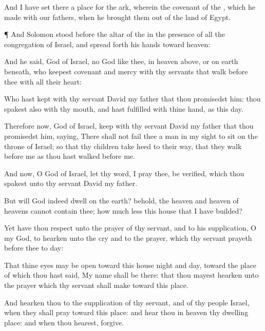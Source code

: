 {And I have
set there a
place for the
ark, wherein
{} the
covenant of the
{}, which he
made with our
fathers, when he brought them
out of the
land of
Egypt.


\par }{\PP {}¶ And
Solomon
stood
before the
altar of the
{} in the presence
of all the
congregation of
Israel, and spread
forth his
hands toward
heaven:

And he
said,
{}
God of
Israel,
{} no
God like thee, in
heaven
above, or on
earth beneath, who
keepest
covenant and
mercy with thy
servants that
walk
before thee with all their
heart:

Who hast
kept with thy
servant
David my
father that thou
promisedst him: thou
spakest also with thy
mouth, and hast
fulfilled
{} with thine
hand, as
{} this
day.

Therefore now,
{}
God of
Israel,
keep with thy
servant
David my
father that thou
promisedst him,
saying, There shall not
fail thee a
man in my
sight to
sit on the
throne of
Israel;
so that thy
children take
heed to their
way, that they
walk
before me as thou hast
walked
before me.

And now, O
God of
Israel, let thy
word, I pray thee, be
verified, which thou
spakest unto thy
servant
David my
father.

But will
God
indeed
dwell on the
earth? behold, the
heaven and
heaven of
heavens cannot
contain thee; how much
less this
house that I have
builded?

Yet have thou
respect unto the
prayer of thy
servant, and to his
supplication, O
{} my
God, to
hearken unto the
cry and to the
prayer, which thy
servant
prayeth
before thee to
day:

That thine
eyes may be
open toward this
house
night and
day,
{} toward the
place of which thou hast
said, My
name shall be there: that thou mayest
hearken unto the
prayer which thy
servant shall
make toward this
place.

And
hearken thou to the
supplication of thy
servant, and of thy
people
Israel, when they shall
pray toward this
place: and
hear thou in
heaven thy
dwelling
place: and when thou
hearest,
forgive.


}
